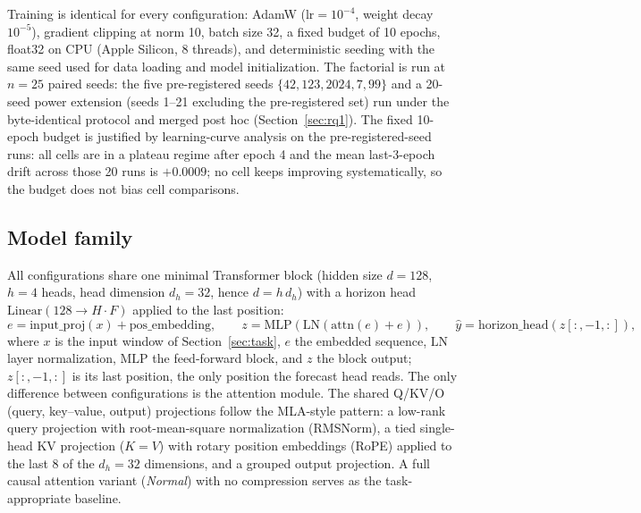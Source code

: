 Training is identical for every configuration: AdamW ($\mathrm{lr}{=}10^{-4}$,
weight decay $10^{-5}$), gradient clipping at norm 10, batch size 32, a
fixed budget of 10 epochs, float32 on CPU (Apple Silicon, 8 threads), and
deterministic seeding with the same seed used for data loading and model
initialization. The factorial is run at $n{=}25$ paired seeds: the five
pre-registered seeds $\{42, 123, 2024, 7, 99\}$ and a 20-seed power
extension (seeds 1--21 excluding the pre-registered set) run under the
byte-identical protocol and merged post hoc (Section~\ref{sec:rq1}). The
fixed 10-epoch budget is justified by learning-curve
analysis on the pre-registered-seed runs: all cells are in a plateau regime
after epoch 4 and the mean last-3-epoch drift across those 20 runs is
$+0.0009$; no cell keeps improving
systematically, so the budget does not bias cell comparisons.

\subsection{Model family}
\label{sec:family}
All configurations share one minimal Transformer block (hidden size
$d{=}128$, $h{=}4$ heads, head dimension $d_h{=}32$, hence
$d = h\,d_h$) with a horizon head
$\mathrm{Linear}(128 \rightarrow H \cdot F)$ applied to the last position:
\begin{equation}
e = \mathrm{input\_proj}(x) + \mathrm{pos\_embedding}, \qquad
z = \mathrm{MLP}(\mathrm{LN}(\mathrm{attn}(e) + e)), \qquad
\hat{y} = \mathrm{horizon\_head}(z[:, -1, :]),
\end{equation}
where $x$ is the input window of Section~\ref{sec:task}, $e$ the embedded
sequence, $\mathrm{LN}$ layer normalization, $\mathrm{MLP}$ the
feed-forward block, and $z$ the block output; $z[:, -1, :]$ is its last
position, the only position the forecast head reads. The only difference
between configurations is the attention module. The shared Q/KV/O
(query, key--value, output) projections follow the MLA-style pattern: a
low-rank query projection with root-mean-square normalization (RMSNorm), a
tied single-head KV projection ($K = V$) with rotary position embeddings
(RoPE) applied to the last 8 of the $d_h{=}32$ dimensions, and a grouped
output projection.
A full causal attention variant (\emph{Normal}) with no compression serves
as the task-appropriate baseline.

